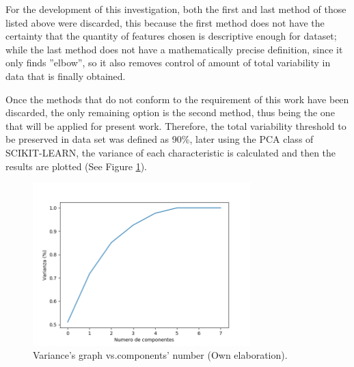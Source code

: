 For the development of this investigation, both the first and last method of those listed above were discarded, this because the first method does not have the certainty that the quantity of features chosen is descriptive enough for dataset; while the last method does not have a mathematically precise definition, since it only finds ''elbow'', so it also removes control of amount of total variability in data that is finally obtained.

\vspace{5mm} %

Once the methods that do not conform to the requirement of this work have been discarded, the only remaining option is the second method, thus being the one that will be applied for present work. Therefore, the total variability threshold to be preserved in data set was defined as 90\%, later using the PCA class of SCIKIT-LEARN, the variance of each characteristic is calculated and then the results are plotted (See Figure \ref{fig:varianza-pca}).

\begin{figure}[h!]
  \begin{center}	\includegraphics[width=0.75\textwidth,frame]{imagenes/Cap3/pca}
  \caption{Variance's graph vs.components' number (Own elaboration).}
  \label{fig:varianza-pca}
  \end{center}
\end{figure}

